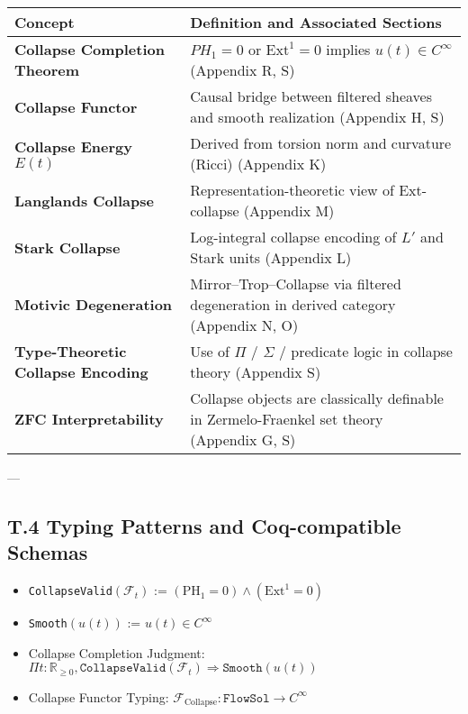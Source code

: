 \documentclass[11pt]{article}
\begin{document}
{\begin{center}
\begin{tabular}{|p{4cm}|p{8cm}|}
\hline
\textbf{Concept} & \textbf{Definition and Associated Sections} \\
\hline
\textbf{Collapse Completion Theorem} & $PH_1 = 0$ or $\mathrm{Ext}^1 = 0$ implies $u(t) \in C^\infty$ \newline (Appendix R, S) \\
\textbf{Collapse Functor} & Causal bridge between filtered sheaves and smooth realization \newline (Appendix H, S) \\
\textbf{Collapse Energy $E(t)$} & Derived from torsion norm and curvature (Ricci) \newline (Appendix K) \\
\textbf{Langlands Collapse} & Representation-theoretic view of Ext-collapse \newline (Appendix M) \\
\textbf{Stark Collapse} & Log-integral collapse encoding of $L'$ and Stark units \newline (Appendix L) \\
\textbf{Motivic Degeneration} & Mirror–Trop–Collapse via filtered degeneration in derived category \newline (Appendix N, O) \\
\textbf{Type-Theoretic Collapse Encoding} & Use of $\Pi$ / $\Sigma$ / predicate logic in collapse theory \newline (Appendix S) \\
\textbf{ZFC Interpretability} & Collapse objects are classically definable in Zermelo-Fraenkel set theory \newline (Appendix G, S) \\
\hline
\end{tabular}
\end{center}

---

\subsection*{T.4 Typing Patterns and Coq-compatible Schemas}

\begin{itemize}
  \item \texttt{CollapseValid}$(\mathcal{F}_t)$ := $(\mathrm{PH}_1 = 0) \wedge (\mathrm{Ext}^1 = 0)$
  \item \texttt{Smooth}$(u(t))$ := $u(t) \in C^\infty$
  \item Collapse Completion Judgment: $\Pi t:\mathbb{R}_{\ge 0}, \texttt{CollapseValid}(\mathcal{F}_t) \Rightarrow \texttt{Smooth}(u(t))$
  \item Collapse Functor Typing: $\mathcal{F}_{\mathrm{Collapse}} : \texttt{FlowSol} \to C^\infty$
\end{itemize}

}
\end{document}
